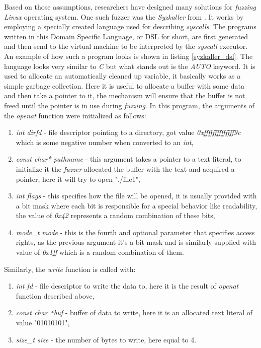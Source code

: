 Based on those assumptions, researchers have designed many solutions for \textit{fuzzing} \textit{Linux} operating system. One such fuzzer was the \textit{Syzkaller} from \cite{syzkaller}. It works by employing a specially created language used for describing \textit{syscalls}. The programs written in this Domain Specific Language, or DSL for short, are first generated and then send to the virtual machine to be interpreted by the \textit{syscall} executor. An example of how such a program looks is shown in listing \ref{syzkaller_dsl}. The language looks very similar to \textit{C} but what stands out is the \textit{AUTO} keyword. It is used to allocate an automatically cleaned up variable, it basically works as a simple garbage collection. Here it is useful to allocate a buffer with some data and then take a pointer to it, the mechanism will ensure that the buffer is not freed until the pointer is in use during \textit{fuzzing}. In this program, the arguments of the \textit{openat} function were initialized as follows:
\begin{enumerate}
    \item \textit{int dirfd} - file descriptor pointing to a directory, got value \textit{0xffffffffffffff9c} which is some negative number when converted to an \textit{int},
    \item \textit{const char* pathname} - this argument takes a pointer to a text literal, to initialize it the \textit{fuzzer} allocated the buffer with the text and acquired a pointer, here it will try to open "./file1",
    \item \textit{int flags} - this specifies how the file will be opened, it is usually provided with a bit mask where each bit is responsible for a special behavior like readability, the value of \textit{0x42} represents a random combination of these bits,
    \item \textit{mode\_t mode} - this is the fourth and optional parameter that specifies access rights, as the previous argument it's a bit mask and is similarly supplied with value of \textit{0x1ff} which is a random combination of them.
\end{enumerate}
Similarly, the \textit{write} function is called with:
\begin{enumerate}
    \item \textit{int fd} - file descriptor to write the data to, here it is the result of \textit{openat} function described above,
    \item \textit{const char *buf} - buffer of data to write, here it is an allocated text literal of value "01010101",
    \item \textit{size\_t size} - the number of bytes to write, here equal to 4.
\end{enumerate}

